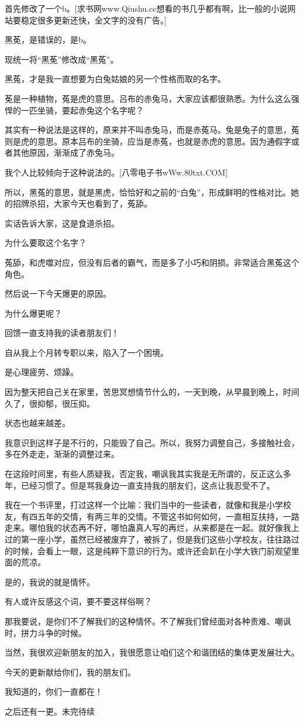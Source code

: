 \begin{this_body}
首先修改了一个b。[求书网www.Qiushu.cc想看的书几乎都有啊，比一般的小说网站要稳定很多更新还快，全文字的没有广告。]

黑莬，是错误的，是b。

现统一将“黑莬”修改成“黑菟”。

黑菟，才是我一直想要为白兔姑娘的另一个性格而取的名字。

莬是一种植物，菟是虎的意思。吕布的赤兔马，大家应该都很熟悉。为什么这么强悍的一匹坐骑，要起赤兔这个名字呢？

其实有一种说法是这样的，原来并不叫赤兔马，而是赤菟马。兔是兔子的意思，菟则是虎的意思。原本吕布的坐骑，应当是赤菟，也就是赤虎的意思。因为通假字或者其他原因，渐渐成了赤兔马。

我个人比较倾向于这种说法的。[八零电子书wWw.80txt.COM]

所以，黑菟的意思，就是黑虎，恰恰好和之前的“白兔”，形成鲜明的性格对比。她的招牌杀招，大家今天也看到了，菟舔。

实话告诉大家，这是食道杀招。

为什么要取这个名字？

菟舔，和虎噬对应，但没有后者的霸气，而是多了小巧和阴损。非常适合黑菟这个角色。

然后说一下今天爆更的原因。

为什么爆更呢？

回馈一直支持我的读者朋友们！

自从我上个月转专职以来，陷入了一个困境。

是心理疲劳、烦躁。

因为整天把自己关在家里，苦思冥想情节什么的，一天到晚，从早晨到晚上，时间久了，很抑郁，很压抑。

状态也越来越差。

我意识到这样子是不行的，只能毁了自己。所以，我努力调整自己，多接触社会，多在外走走，渐渐的调整过来。

在这段时间里，有些人质疑我，否定我，嘲讽我其实我是无所谓的，反正这么多年，已经习惯了。但是骂我身边一直支持我的朋友们，这点让我忍受不了。

我在一个书评里，打过这样一个比喻：我们当中的一些读者，就像和我是小学校友，有四五年的交情，有两三年的交情。不管这书如何如何，一直相互扶持，一路走来。哪怕我的状态再不好，哪怕蛊真人写的再烂，从来都是在一起。就好像我上过的第一座小学，虽然已经被废弃了，被拆了，但是我们这些小学校友，往往路过的时候，会看上一眼，这是纯粹下意识的行为。或许还会趴在小学大铁门前观望里面的荒凉。

是的，我说的就是情怀。

有人或许反感这个词，要不要这样俗啊？

那我要说，是你们不了解我们的这种情怀。不了解我们曾经面对各种责难、嘲讽时，拼力斗争的时候。

当然，我很欢迎新朋友的加入，我很愿意让咱们这个和谐团结的集体更发展壮大。

今天的更新献给你们，我的朋友们。

我知道的，你们一直都在！

之后还有一更。未完待续

\end{this_body}

